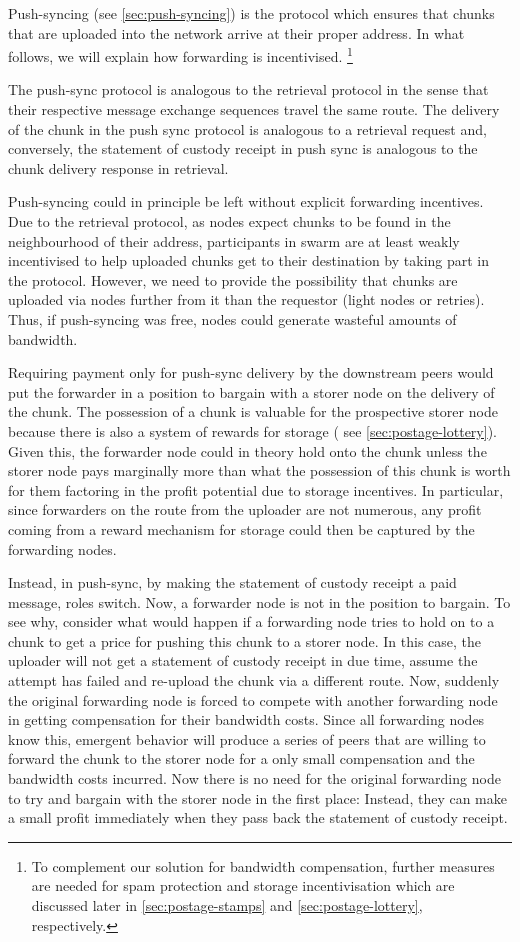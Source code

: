 Push-syncing (see \ref{sec:push-syncing}) is the protocol which ensures that chunks that are uploaded into the network arrive at their proper address. In what follows, we will explain how forwarding is incentivised.
%
%
\footnote{To complement our solution for bandwidth compensation, further measures are needed for spam protection and storage incentivisation which are discussed later in \ref{sec:postage-stamps} and \ref{sec:postage-lottery}, respectively.}



The push-sync protocol is analogous to the retrieval protocol in the sense that their respective message exchange sequences travel the same route.
The delivery of the chunk in the push sync protocol is analogous to a retrieval request and, conversely, the statement of custody receipt in push sync is analogous to the chunk delivery response in retrieval.

Push-syncing could in principle be left without explicit forwarding incentives. Due to the retrieval protocol, as nodes expect chunks to be found in the neighbourhood of   their address, participants in swarm are at least weakly incentivised to help uploaded chunks get to their destination by taking part in the protocol. However, we  need to provide the possibility that chunks are uploaded via nodes further from it than the requestor (light  nodes or retries). Thus, if push-syncing was free, nodes could generate wasteful amounts of bandwidth. 

Requiring payment only for push-sync delivery by the downstream peers would put the forwarder in a position to bargain with a storer node on the delivery of the chunk. The possession of a chunk is valuable for the prospective storer node because there is also a system of rewards for storage ( see \ref{sec:postage-lottery}). Given this, the forwarder node could in theory hold onto the chunk unless the storer node pays marginally more than what the possession of this chunk is worth for them factoring in the profit potential due to storage incentives. In particular, since forwarders on the route from the uploader are not numerous, any profit coming from a reward mechanism for storage could then be captured by the forwarding nodes.

Instead, in push-sync, by making the statement of custody receipt a paid message, roles switch. Now, a forwarder node is not in the position to bargain. To see why, consider what would happen if a forwarding node tries to hold on to a chunk to get a price for pushing this chunk to a storer node. In this case, the uploader will not get a statement of custody receipt in due time, assume the attempt has failed and re-upload the chunk via a different route. Now, suddenly the original forwarding node is forced to compete with another forwarding node in getting compensation for their bandwidth costs. Since all forwarding nodes know this, emergent behavior will produce a series of peers that are willing to forward the chunk to the storer node for a only small compensation and the bandwidth costs incurred. Now there is no need for the original forwarding node to try and bargain with the storer node in the first place: Instead, they can make a small profit immediately when they pass back the statement of custody receipt. 


